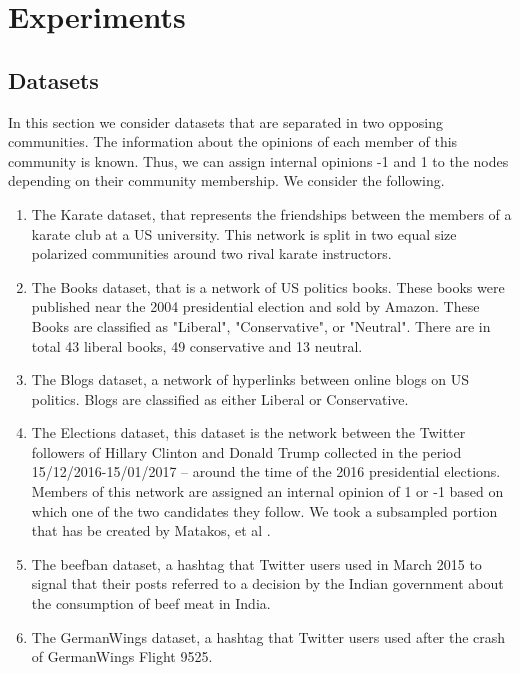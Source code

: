\chapter{Experiments}
\label{ch:experiments}

\section{Datasets}
\label{sec:ds}

In this section we consider datasets that are separated in two opposing communities. The information about the opinions of each member of this community is known. Thus, we can assign internal opinions -1 and 1 to the nodes depending on their community membership\cite{tsapMatakosTerzi}.  We consider the following.

\begin{enumerate}

  \item The Karate dataset, that represents the friendships between the members of a karate club at a US university. This network is split in two equal size polarized communities around two rival karate instructors.
  
  \item The Books dataset, that is a network of US politics books. These books were published near the 2004 presidential election and sold by Amazon. These Books are classified as "Liberal", "Conservative", or "Neutral".  There are in total 43 liberal books, 49 conservative and 13 neutral.
  
  \item The Blogs dataset, a network of hyperlinks between online blogs on US politics. Blogs are classified as either Liberal or Conservative.
  
  \item The Elections dataset, this dataset is the network between the Twitter followers of Hillary Clinton and Donald Trump collected in the period 15/12/2016-15/01/2017 – around the time of the 2016 presidential elections. Members of this network are assigned an internal opinion of 1 or -1 based on which one of the two candidates they follow. We took a subsampled portion that has be created by Matakos, et al \cite{tsapMatakosTerzi}.
    
  \item The beefban dataset, a  hashtag that Twitter users used in March 2015 to signal that their posts referred to a decision by the Indian government about the consumption of beef meat in India.
  
  \item The GermanWings dataset, a  hashtag that Twitter users used after the crash of GermanWings Flight 9525.
  
\end{enumerate}


